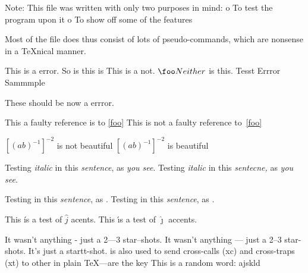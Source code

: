 %
%
%
Note: This file was written with only two purposes in mind:
    o To test the program upon it
    o To show off some of the features

Most of the file does thus consist of lots of pseudo-commands, which
are nonsense in a TeXnical manner.




\foo This is a error.
So is this is \foo
\smallskip This is a not. $\foo Neither$ is this.
Tesst
Errror
Sammmple

\startsection[title={Testing ConTeXt}]
These should be now a errror.
\stoptext


This a faulty reference is to \ref{foo}
This is not a faulty reference to~\ref{foo}


$[(ab)^{-1}]^{-2}$  is not beautiful
${{[{(ab)}^{-1}]}}^{-2}$ is beautiful


Testing {\it italic} in \/ this {\em sentence\/}, as {\em you \/ see\/}.
Testing {\it italic\/} in this {\em sentecne,} as {\em you see}.


Testing  in \/ this \textit{sentence\/}, as .
Testing  in this \textit{sentence}, as .


This \'is a test of $\hat{j}$ acents.
This \'{\i}s a test of $\hat{\jmath}$ accents.


It wasn't anything - just a 2---3 star--shots.
It wasn't anything --- just a 2--3 star-shots.
It's just a startt-shot.
is also used to send cross-calls (xc) and cross-traps (xt) to other
in plain TeX---are the key
This is a random word: ajskld


